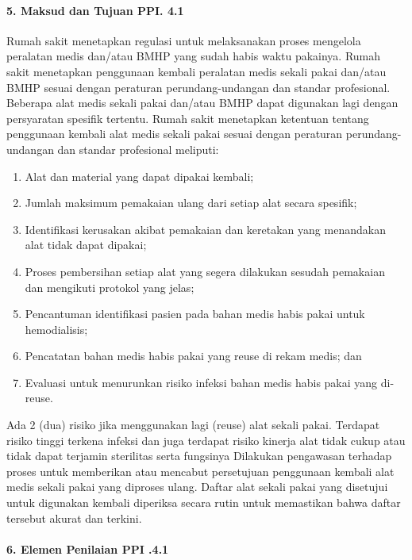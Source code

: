 \documentclass[
]{book}
\providecommand{\tightlist}{%
  \setlength{\itemsep}{0pt}\setlength{\parskip}{0pt}}
\begin{document}
\hypertarget{maksud-dan-tujuan-ppi.-4.1}{%
\paragraph*{5. Maksud dan Tujuan PPI. 4.1}\label{maksud-dan-tujuan-ppi.-4.1}}

Rumah sakit menetapkan regulasi untuk melaksanakan proses mengelola peralatan medis dan/atau BMHP yang sudah habis waktu pakainya. Rumah sakit menetapkan penggunaan kembali peralatan medis sekali pakai dan/atau BMHP sesuai dengan peraturan perundang-undangan dan standar profesional. Beberapa alat medis sekali pakai dan/atau BMHP dapat digunakan lagi dengan persyaratan spesifik tertentu. Rumah sakit menetapkan ketentuan tentang penggunaan kembali alat medis sekali pakai sesuai dengan peraturan perundang-undangan dan standar profesional meliputi:

\begin{enumerate}
\def\labelenumi{\alph{enumi}.}
\tightlist
\item
  Alat dan material yang dapat dipakai kembali;
\item
  Jumlah maksimum pemakaian ulang dari setiap alat secara spesifik;
\item
  Identifikasi kerusakan akibat pemakaian dan keretakan yang menandakan alat tidak dapat dipakai;
\item
  Proses pembersihan setiap alat yang segera dilakukan sesudah pemakaian dan mengikuti protokol yang jelas;
\item
  Pencantuman identifikasi pasien pada bahan medis habis pakai untuk hemodialisis;
\item
  Pencatatan bahan medis habis pakai yang reuse di rekam medis; dan
\item
  Evaluasi untuk menurunkan risiko infeksi bahan medis habis pakai yang di-reuse.
\end{enumerate}

Ada 2 (dua) risiko jika menggunakan lagi (reuse) alat sekali pakai. Terdapat risiko tinggi terkena infeksi dan juga terdapat risiko kinerja alat tidak cukup atau tidak dapat terjamin sterilitas serta fungsinya Dilakukan pengawasan terhadap proses untuk memberikan atau mencabut persetujuan penggunaan kembali alat medis sekali pakai yang diproses ulang. Daftar alat sekali pakai yang disetujui untuk digunakan kembali diperiksa secara rutin untuk memastikan bahwa daftar tersebut akurat dan terkini.

\hypertarget{elemen-penilaian-ppi-.4.1}{%
\paragraph*{6. Elemen Penilaian PPI .4.1}\label{elemen-penilaian-ppi-.4.1}}
\end{document}
